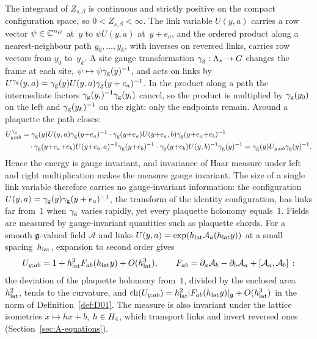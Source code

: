 The integrand of $Z_{s,\beta}$ is continuous and strictly positive on the compact configuration space, so $0<Z_{s,\beta}<\infty$. The link variable $U(y,a)$ carries a row vector $\psi\in\mathbb{C}^{n_G}$ at~$y$ to $\psi U(y,a)$ at~$y+e_a$, and the ordered product along a nearest-neighbour path $y_0,\ldots,y_k$, with inverses on reversed links, carries row vectors from $y_0$ to~$y_k$. A site gauge transformation $\gamma_{\rm g}:\Lambda_s\to G$ changes the frame at each site, $\psi\mapsto\psi\gamma_{\rm g}(y)^{-1}$, and acts on links by $U^{\gamma_{\rm g}}(y,a)=\gamma_{\rm g}(y)U(y,a)\gamma_{\rm g}(y+e_a)^{-1}$. In the product along a path the intermediate factors $\gamma_{\rm g}(y_i)^{-1}\gamma_{\rm g}(y_i)$ cancel, so the product is multiplied by $\gamma_{\rm g}(y_0)$ on the left and $\gamma_{\rm g}(y_k)^{-1}$ on the right: only the endpoints remain. Around a plaquette the path closes:
\begin{align*}
U^{\gamma_{\rm g}}_{y;ab}
&=\gamma_{\rm g}(y)U(y,a)\gamma_{\rm g}(y{+}e_a)^{-1}\cdot\gamma_{\rm g}(y{+}e_a)U(y{+}e_a,b)\gamma_{\rm g}(y{+}e_a{+}e_b)^{-1}\\
&\quad\cdot\gamma_{\rm g}(y{+}e_a{+}e_b)U(y{+}e_b,a)^{-1}\gamma_{\rm g}(y{+}e_b)^{-1}\cdot\gamma_{\rm g}(y{+}e_b)U(y,b)^{-1}\gamma_{\rm g}(y)^{-1}
=\gamma_{\rm g}(y)U_{y;ab}\gamma_{\rm g}(y)^{-1}.
\end{align*}
Hence the energy is gauge invariant, and invariance of Haar measure under left and right multiplication makes the measure gauge invariant. The size of a single link variable therefore carries no gauge-invariant information: the configuration $U(y,a)=\gamma_{\rm g}(y)\gamma_{\rm g}(y+e_a)^{-1}$, the transform of the identity configuration, has links far from~$1$ when $\gamma_{\rm g}$ varies rapidly, yet every plaquette holonomy equals~$1$. Fields are measured by gauge-invariant quantities such as plaquette chords. For a smooth $\mathfrak{g}$-valued field $\mathcal A$ and links $U(y,a)=\exp(h_{\rm lat}\mathcal A_a(h_{\rm lat}y))$ at a small spacing~$h_{\rm lat}$, expansion to second order gives
\begin{equation*}
U_{y;ab}=1+h_{\rm lat}^2F_{ab}(h_{\rm lat}y)+O(h_{\rm lat}^3),\qquad F_{ab}=\partial_a\mathcal A_b-\partial_b\mathcal A_a+[\mathcal A_a,\mathcal A_b]\,:
\end{equation*}
the deviation of the plaquette holonomy from~$1$, divided by the enclosed area~$h_{\rm lat}^2$, tends to the curvature, and $\operatorname{ch}(U_{y;ab})=h_{\rm lat}^2|F_{ab}(h_{\rm lat}y)|_{\mathfrak{g}}+O(h_{\rm lat}^3)$ in the norm of Definition~\ref{def:D01}. The measure is also invariant under the lattice isometries $x\mapsto hx+b$, $h\in H_4$, which transport links and invert reversed ones (Section~\ref{sec:A-equations}).

